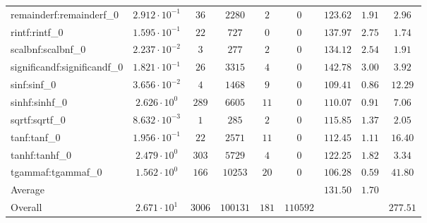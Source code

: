 \begin{tabular}{|l|c|c|c|c|c|c|c|c|}
remainderf:remainderf\_0     & $ 2.912 \cdot 10^{-1} $ & $ 36     $ & $ 2280   $ & $ 2   $ & $ 0      $ & $ 123.62      $ & $ 1.91    $ & $ 2.96    $ \\
rintf:rintf\_0               & $ 1.595 \cdot 10^{-1} $ & $ 22     $ & $ 727    $ & $ 0   $ & $ 0      $ & $ 137.97      $ & $ 2.75    $ & $ 1.74    $ \\
scalbnf:scalbnf\_0           & $ 2.237 \cdot 10^{-2} $ & $ 3      $ & $ 277    $ & $ 2   $ & $ 0      $ & $ 134.12      $ & $ 2.54    $ & $ 1.91    $ \\
significandf:significandf\_0 & $ 1.821 \cdot 10^{-1} $ & $ 26     $ & $ 3315   $ & $ 4   $ & $ 0      $ & $ 142.78      $ & $ 3.00    $ & $ 3.92    $ \\
sinf:sinf\_0                 & $ 3.656 \cdot 10^{-2} $ & $ 4      $ & $ 1468   $ & $ 9   $ & $ 0      $ & $ 109.41      $ & $ 0.86    $ & $ 12.29   $ \\
sinhf:sinhf\_0               & $ 2.626 \cdot 10^{0}  $ & $ 289    $ & $ 6605   $ & $ 11  $ & $ 0      $ & $ 110.07      $ & $ 0.91    $ & $ 7.06    $ \\
sqrtf:sqrtf\_0               & $ 8.632 \cdot 10^{-3} $ & $ 1      $ & $ 285    $ & $ 2   $ & $ 0      $ & $ 115.85      $ & $ 1.37    $ & $ 2.05    $ \\
tanf:tanf\_0                 & $ 1.956 \cdot 10^{-1} $ & $ 22     $ & $ 2571   $ & $ 11  $ & $ 0      $ & $ 112.45      $ & $ 1.11    $ & $ 16.40   $ \\
tanhf:tanhf\_0               & $ 2.479 \cdot 10^{0}  $ & $ 303    $ & $ 5729   $ & $ 4   $ & $ 0      $ & $ 122.25      $ & $ 1.82    $ & $ 3.34    $ \\
tgammaf:tgammaf\_0           & $ 1.562 \cdot 10^{0}  $ & $ 166    $ & $ 10253  $ & $ 20  $ & $ 0      $ & $ 106.28      $ & $ 0.59    $ & $ 41.80   $ \\
\hline
Average                      & $                     $ & $        $ & $        $ & $     $ & $        $ & $ 131.50      $ & $ 1.70    $ & $         $ \\
\hline
Overall                      & $ 2.671 \cdot 10^{1}  $ & $ 3006   $ & $ 100131 $ & $ 181 $ & $ 110592 $ & $             $ & $         $ & $ 277.51  $ \\
\hline
\end{tabular}
